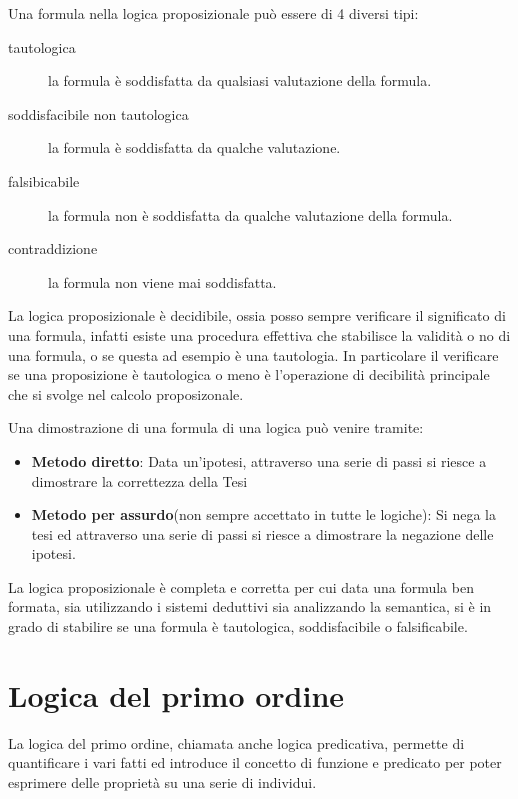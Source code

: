 Una formula nella logica proposizionale può essere di 4 diversi tipi:
\begin{description}
    \item[tautologica] la formula è soddisfatta da qualsiasi valutazione della formula.
    \item[soddisfacibile non tautologica] la formula è soddisfatta da qualche valutazione.
    \item[falsibicabile] la formula non è soddisfatta da qualche valutazione della formula.
    \item[contraddizione] la formula non viene mai soddisfatta.
\end{description}

La logica proposizionale è decidibile, ossia posso sempre verificare il significato di una formula, infatti esiste
una procedura effettiva che stabilisce la validità o no di una formula, o se questa ad esempio è una tautologia.\newline
In particolare il verificare se una proposizione è tautologica o meno è l’operazione di decibilità principale che si svolge
nel calcolo proposizonale.

Una dimostrazione di una formula di una logica può venire tramite:
\begin{itemize}
  \item  \textbf{Metodo diretto}: Data un'ipotesi, attraverso una serie di passi
          si riesce a dimostrare la correttezza della Tesi
  \item \textbf{Metodo per assurdo}(non sempre accettato in tutte le logiche):
        Si nega la tesi ed attraverso una serie di passi si riesce a dimostrare
        la negazione delle ipotesi.
\end{itemize}

La logica proposizionale è completa e corretta per cui data una formula ben formata, sia utilizzando i sistemi deduttivi sia analizzando
la semantica, si è in grado di stabilire se una formula è tautologica, soddisfacibile o falsificabile.

\section{Logica del primo ordine}
La logica del primo ordine, chiamata anche logica predicativa, permette di quantificare i vari fatti ed introduce il concetto di funzione e
predicato per poter esprimere delle proprietà su una serie di individui.

